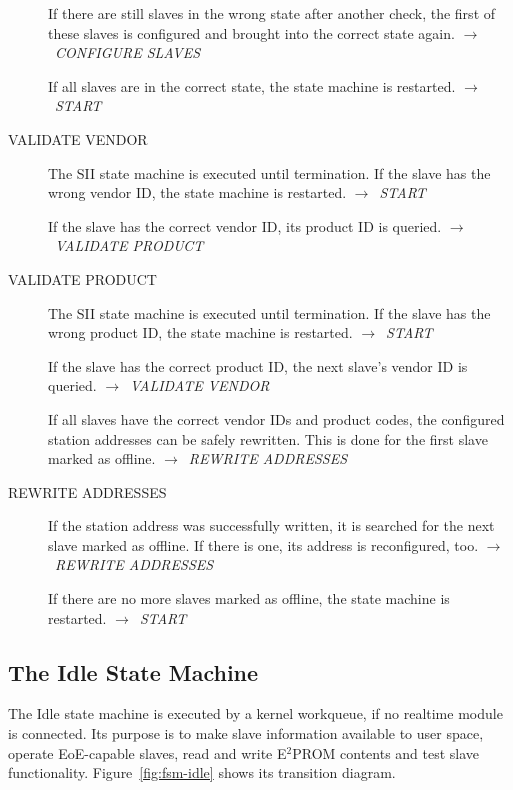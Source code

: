 \documentclass[a4paper,12pt,BCOR6mm,bibtotoc,idxtotoc]{scrbook}
\begin{document}
\begin{description}
  If there are still slaves in the wrong state after another check,
  the first of these slaves is configured and brought into the correct
  state again. $\rightarrow$~\textit{CONFIGURE SLAVES}

  If all slaves are in the correct state, the state machine is
  restarted. $\rightarrow$~\textit{START}

\item[VALIDATE VENDOR] The SII state machine is executed until
  termination. If the slave has the wrong vendor ID, the state machine
  is restarted. $\rightarrow$~\textit{START}

  If the slave has the correct vendor ID, its product ID is queried.
  $\rightarrow$~\textit{VALIDATE PRODUCT}

\item[VALIDATE PRODUCT] The SII state machine is executed until
  termination. If the slave has the wrong product ID, the state
  machine is restarted. $\rightarrow$~\textit{START}

  If the slave has the correct product ID, the next slave's vendor ID
  is queried. $\rightarrow$~\textit{VALIDATE VENDOR}

  If all slaves have the correct vendor IDs and product codes, the
  configured station addresses can be safely rewritten. This is done
  for the first slave marked as offline.
  $\rightarrow$~\textit{REWRITE ADDRESSES}

\item[REWRITE ADDRESSES] If the station address was successfully
  written, it is sear\-ched for the next slave marked as offline. If
  there is one, its address is reconfigured, too.
  $\rightarrow$~\textit{REWRITE ADDRESSES}

  If there are no more slaves marked as offline, the state machine is
  restarted. $\rightarrow$~\textit{START}
\end{description}


\subsection{The Idle State Machine}
\label{sec:fsm-idle}

The Idle state machine is executed by a kernel workqueue, if no
realtime module is connected. Its purpose is to make slave information
available to user space, operate EoE-capable slaves, read and write
E$^2$PROM contents and test slave functionality.
Figure~\ref{fig:fsm-idle} shows its transition diagram.
\end{document}
